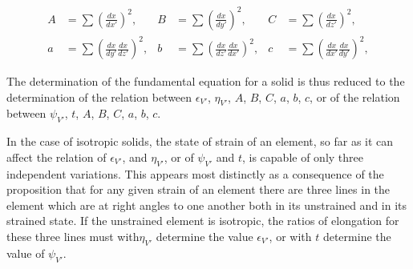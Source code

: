 \documentclass[12pt]{memoir}
\begin{document}
{\begin{align}
A&= \sum \left( \frac{dx}{dx'} \right)^2,  &  B&= \sum \left( \frac{dx}{dy'} \right)^2,  & C&=  \sum \left( \frac{dx}{dz'} \right)^2, \label{418}\\
a&= \sum \left( \frac{dx}{dy'}\frac{dx}{dz'} \right)^2, &  b&= \sum \left( \frac{dx}{dz'}\frac{dx}{dx'} \right)^2,  & c&=  \sum \left( \frac{dx}{dx'}\frac{dx}{dy'} \right)^2,    \label{419}\end{align}


The determination of the fundamental equation for a solid is thus reduced to the determination of the relation between $\epsilon_{V'}$, $\eta_{V'}$, $A$, $B$, $C$, $a$, $b$, $c$, or of the relation between $\psi_{V'}$, $t$, $A$, $B$, $C$, $a$, $b$, $c$.


In the case of isotropic solids, the state of strain of an element, so far as it can affect the relation of $\epsilon_{V'}$, and $\eta_{V'}$, or of $\psi_{V'}$ and $t$, is capable of only three independent variations. This appears most distinctly as a consequence of the proposition that for any given strain of an element there are three lines in the element which are at right angles to one another both in its unstrained and in its strained state. If the unstrained element is isotropic, the ratios of elongation for these three lines must with$\eta_{V'}$ determine the value $\epsilon_{V'}$, or with $t$ determine the value of $\psi_{V'}$.


}
\end{document}
